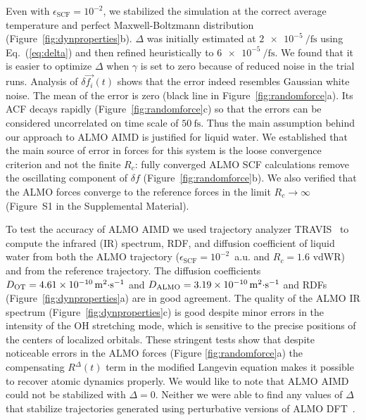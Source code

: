 \documentclass[aps,prl,reprint,amsmath,amssymb]{revtex4-1}
\begin{document}
Even with $\epsilon_{\text{SCF}} = 10^{-2}$, we stabilized the simulation at the correct average temperature and perfect Maxwell-Boltzmann distribution (Figure~\ref{fig:dynproperties}b). $\Delta$ was initially estimated at $\SI{2e-5}{\per\fs}$ using Eq.~(\ref{eq:delta}) and then refined heuristically to $\SI{6e-5}{\per\fs}$. 
We found that it is easier to optimize $\Delta$ when $\gamma$ is set to zero because of reduced noise in the trial runs. 
%
Analysis of $\delta \vec{f_{i}}(t)$ shows that the error indeed resembles Gaussian white noise. The mean of the error is zero (black line in Figure~\ref{fig:randomforce}a). Its ACF decays rapidly (Figure~\ref{fig:randomforce}c) so that the errors can be considered uncorrelated on time scale of $\SI{50}{\fs}$. Thus the main assumption behind our approach to ALMO AIMD is justified for liquid water. We established that the main source of error in forces for this system is the loose convergence criterion and not the finite $R_c$: fully converged ALMO SCF calculations remove the oscillating component of $\delta f$ (Figure~\ref{fig:randomforce}b). We also verified that the ALMO forces converge to the reference forces in the limit $R_{c} \rightarrow \infty$ 
(Figure~S1 in the Supplemental Material).



To test the accuracy of ALMO AIMD we used trajectory analyzer TRAVIS~\cite{a:travis-main} to compute the infrared (IR) spectrum, RDF, and diffusion coefficient of liquid water from both the ALMO trajectory ($\epsilon_{\text{SCF}} = 10^{-2}$~a.u. and $R_{c} = 1.6$ vdWR) and from the reference trajectory. 
The diffusion coefficients $D_{\text{OT}}=\SI{4.61E-10}{\m^{2}\cdot\s^{-1}}$ and $D_{\text{ALMO}}=\SI{3.19E-10}{\m^{2}\cdot\s^{-1}}$ and RDFs (Figure~\ref{fig:dynproperties}a) are in good agreement. The quality of the ALMO IR spectrum (Figure~\ref{fig:dynproperties}c) is good despite minor errors in the intensity of the OH stretching mode, which is sensitive to the precise positions of the centers of localized orbitals. These stringent tests show that despite noticeable errors in the ALMO forces (Figure \ref{fig:randomforce}a) the compensating $R^{\Delta}(t)$ term in the modified Langevin equation makes it possible to recover atomic dynamics properly. We would like to note that ALMO AIMD could not be stabilized with $\Delta=0$. Neither we were able to find any values of $\Delta$ that stabilize trajectories generated using perturbative versions of ALMO DFT~\cite{a:almo-ls}.
\end{document}
